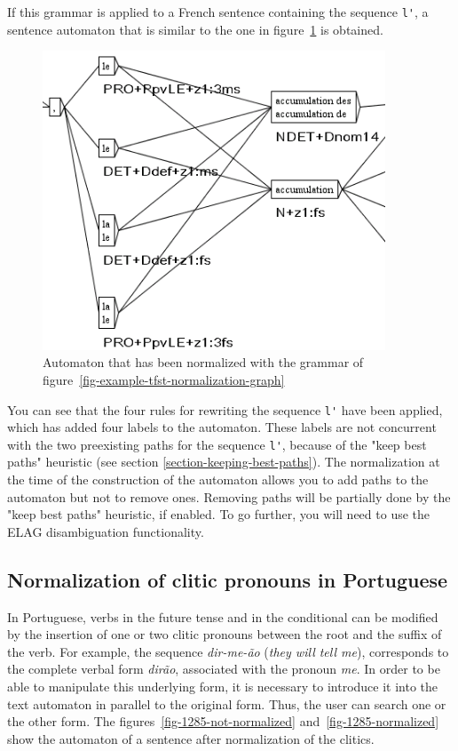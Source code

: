 \bigskip
\noindent If this grammar is applied to a French sentence containing the sequence
\verb+l'+, a sentence automaton that is similar to the one in
figure~\ref{fig-tfst-normalization-results} is obtained.

\begin{figure}[!ht]
\begin{center}
\includegraphics[width=10.2cm]{resources/img/fig7-5.png}
\caption{Automaton that has been normalized with the grammar of 
figure~\ref{fig-example-tfst-normalization-graph}\label{fig-tfst-normalization-results}}
\end{center}
\end{figure}

\bigskip
\noindent You can see that the four rules for rewriting the sequence \verb+l'+
have been applied, which has added four labels to the automaton. These labels are
not concurrent with the two preexisting paths for the sequence \verb+l'+,
because of the "keep best paths" heuristic (see section
\ref{section-keeping-best-paths}). The
normalization at the time of the construction of the automaton allows you to 
add paths to the automaton but not to remove ones. Removing paths will be
partially done by the "keep best paths" heuristic, if enabled. To go further,
you will need to use the ELAG disambiguation functionality.


\subsection{Normalization of clitic pronouns in Portuguese}
\label{section-portuguese-clitics}
In Portuguese, verbs in the future tense and in the conditional can be modified
by the insertion of one or two clitic pronouns between the root and the suffix
of the verb. For example, the sequence \textit{dir-me-\~ao} (\textit{they will
tell me}), corresponds to the complete verbal form \textit{dir\~ao}, associated
with the pronoun \textit{me}. In order to be able to manipulate this underlying form,
it is necessary to introduce it into the text automaton in parallel to the
original form. Thus, the user can search one or the other form. The 
figures~\ref{fig-1285-not-normalized} and~\ref{fig-1285-normalized}  show the
automaton of a sentence after normalization of the clitics.


